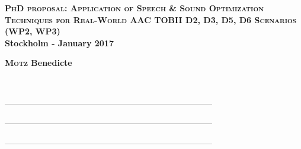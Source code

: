 \documentclass[12pt,a4paper,oneside,onecolumn]{article}
\begin{document}


\begin{center}	
	\huge{\textbf{\scshape PhD proposal: Application of Speech \& Sound Optimization Techniques for Real-World AAC TOBII D2, D3, D5, D6 Scenarios (WP2, WP3) }}\\
	\vspace{0.5cm}
	\Large{\textbf{Stockholm - January 2017}}\\
	\vspace{0.5cm}

	\begin{small}\textbf{\textsc{Motz} Benedicte} \end{small} \\
\vspace{0.5cm}
	\begin{minipage}[c]{63px} %
	 \end{minipage}
\end{center}



\pagestyle{fancy}
\headheight 15pt
\chead{} 										%
\rhead{\leftmark} 								%
\cfoot{} 					%
\rfoot{\thepage} 								%
\renewcommand{\headrulewidth}{0.4pt} 			%
\renewcommand{\footrulewidth}{0.4pt} 			%
---------------------------------------------------------------------------


\tableofcontents
\listoffigures
\listoftables
---------------------------------------------------------------------------

\newpage
{}
\rfoot{\thepage/\pageref{LastPage}} 					%
---------------------------------------------------------------------------

\end{document}
